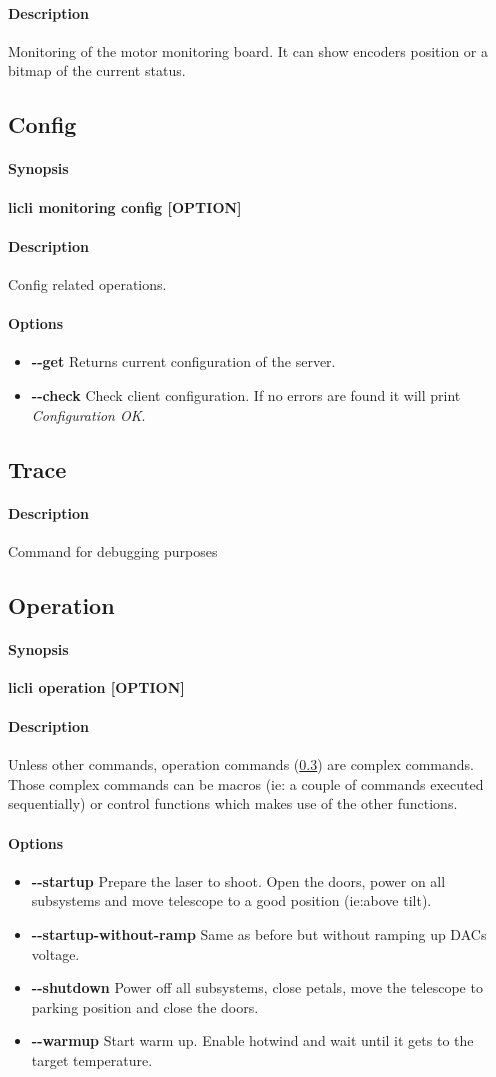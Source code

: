 \documentclass[letterpaper, 10 pt]{article}
\newcommand{\cmdsection}[1]{\paragraph{#1}\mbox{}\par}
\begin{document}
\cmdsection{Description} Monitoring of the motor monitoring board. It can show encoders position or a bitmap of the current status.

\subsection{Config}
\cmdsection{Synopsis} \textbf{licli monitoring config [OPTION]}\\

\cmdsection{Description} Config related operations. \\
\cmdsection{Options}
\begin{itemize}
	\item[] \textbf{-{}-get} Returns current configuration of the server.
	\item[] \textbf{-{}-check} Check client configuration. If no errors are found it will print \emph{Configuration OK}.
\end{itemize}

\subsection{Trace}
\cmdsection{Description} Command for debugging purposes

\subsection{Operation} \label{operationcmds}
\cmdsection{Synopsis} \textbf{licli operation [OPTION]}\\

\cmdsection{Description} Unless other commands, operation commands (\ref{operationcmds}) are complex commands. Those complex commands can be macros (ie: a couple of commands executed sequentially) or control functions which makes use of the other functions. \\
\cmdsection{Options}
\begin{itemize}
	\item[] \textbf{-{}-startup} Prepare the laser to shoot. Open the doors, power on all subsystems and move telescope to a good position (ie:above tilt).
	\item[] \textbf{-{}-startup-without-ramp} Same as before but without ramping up DACs voltage.
	\item[] \textbf{-{}-shutdown} Power off all subsystems, close petals, move the telescope to parking position and close the doors.
	\item[] \textbf{-{}-warmup} Start warm up. Enable hotwind and wait until it gets to the target temperature.
\end{itemize}
\end{document}
